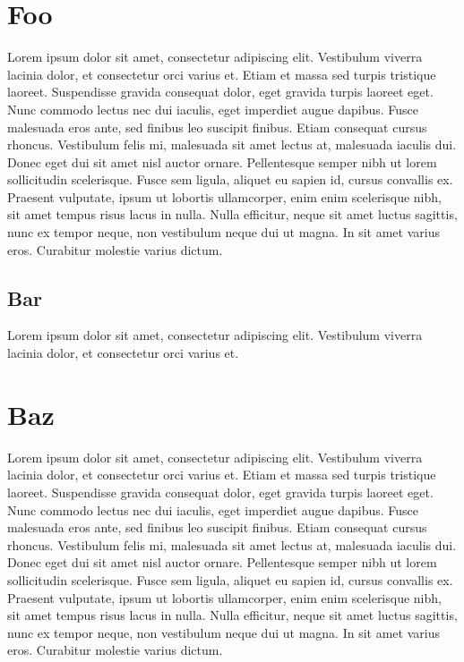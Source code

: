 

\chapter{Foo}

Lorem ipsum dolor sit amet, consectetur adipiscing elit. Vestibulum viverra
lacinia dolor, et consectetur orci varius et. Etiam et massa sed turpis
tristique laoreet. Suspendisse gravida consequat dolor, eget gravida turpis
laoreet eget. Nunc commodo lectus nec dui iaculis, eget imperdiet augue dapibus.
Fusce malesuada eros ante, sed finibus leo suscipit finibus. Etiam consequat
cursus rhoncus. Vestibulum felis mi, malesuada sit amet lectus at, malesuada
iaculis dui. Donec eget dui sit amet nisl auctor ornare. Pellentesque semper
nibh ut lorem sollicitudin scelerisque. Fusce sem ligula, aliquet eu sapien id,
cursus convallis ex. Praesent vulputate, ipsum ut lobortis ullamcorper, enim
enim scelerisque nibh, sit amet tempus risus lacus in nulla. Nulla efficitur,
neque sit amet luctus sagittis, nunc ex tempor neque, non vestibulum neque dui
ut magna. In sit amet varius eros. Curabitur molestie varius dictum.

\section{Bar}

Lorem ipsum dolor sit amet, consectetur adipiscing elit. Vestibulum viverra
lacinia dolor, et consectetur orci varius et.

\chapter{Baz}

Lorem ipsum dolor sit amet, consectetur adipiscing elit. Vestibulum viverra
lacinia dolor, et consectetur orci varius et. Etiam et massa sed turpis
tristique laoreet. Suspendisse gravida consequat dolor, eget gravida turpis
laoreet eget. Nunc commodo lectus nec dui iaculis, eget imperdiet augue dapibus.
Fusce malesuada eros ante, sed finibus leo suscipit finibus. Etiam consequat
cursus rhoncus. Vestibulum felis mi, malesuada sit amet lectus at, malesuada
iaculis dui. Donec eget dui sit amet nisl auctor ornare. Pellentesque semper
nibh ut lorem sollicitudin scelerisque. Fusce sem ligula, aliquet eu sapien id,
cursus convallis ex. Praesent vulputate, ipsum ut lobortis ullamcorper, enim
enim scelerisque nibh, sit amet tempus risus lacus in nulla. Nulla efficitur,
neque sit amet luctus sagittis, nunc ex tempor neque, non vestibulum neque dui
ut magna. In sit amet varius eros. Curabitur molestie varius dictum.

